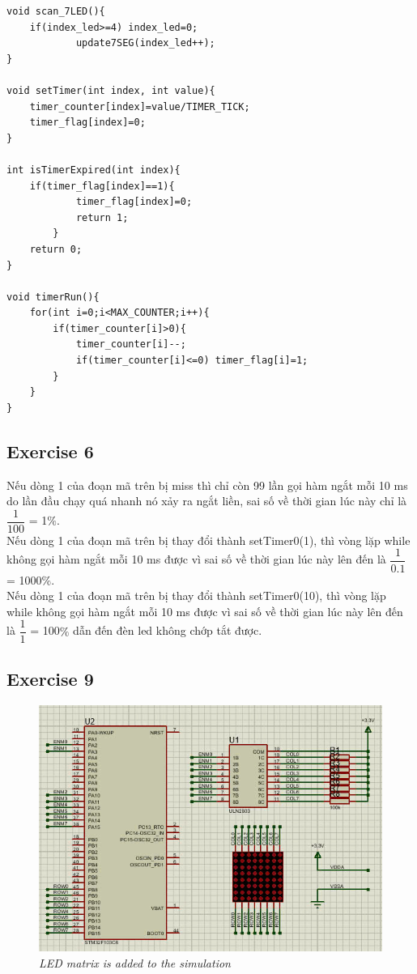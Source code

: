\begin{lstlisting}[caption=software$\_$timer5.c]
void scan_7LED(){
	if(index_led>=4) index_led=0;
			update7SEG(index_led++);
}

void setTimer(int index, int value){
	timer_counter[index]=value/TIMER_TICK;
	timer_flag[index]=0;
}

int isTimerExpired(int index){
	if(timer_flag[index]==1){
    		timer_flag[index]=0;
    		return 1;
        }
	return 0;
}

void timerRun(){
	for(int i=0;i<MAX_COUNTER;i++){
		if(timer_counter[i]>0){
			timer_counter[i]--;
			if(timer_counter[i]<=0) timer_flag[i]=1;
		}
	}
}
\end{lstlisting}


\subsection{Exercise 6}
Nếu dòng 1 của đoạn mã trên bị miss thì chỉ còn 99 lần gọi hàm ngắt mỗi 10 ms do lần đầu chạy quá nhanh nó xảy ra ngắt liền, sai số về thời gian lúc này chỉ là $\dfrac{1}{100}$ = 1$\%$.\\
Nếu dòng 1 của đoạn mã trên bị thay đổi thành setTimer0(1), thì vòng lặp while không gọi hàm ngắt mỗi 10 ms được vì sai số về thời gian lúc này lên đến là $\dfrac{1}{0.1}$ = 1000$\%$.\\
Nếu dòng 1 của đoạn mã trên bị thay đổi thành setTimer0(10), thì vòng lặp while không gọi hàm ngắt mỗi 10 ms được vì sai số về thời gian lúc này lên đến là $\dfrac{1}{1}$ = 100$\%$ dẫn đến đèn led không chớp tắt được.


\subsection{Exercise 9}
\begin{figure}[!htp]
    \centering
    \includegraphics[width=5.5in]{source/picture/bai_2/pic9.jpg}
    \caption{\textit{LED matrix is added to the simulation}}
    \label{bai2_pic9}
\end{figure}



